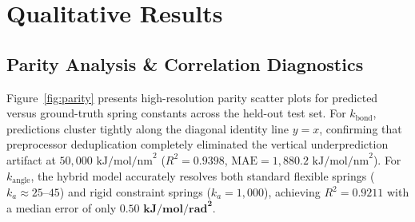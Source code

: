 \documentclass[11pt,a4paper]{article}
\begin{document}
\begin{table}[htbp]
\centering
\caption{Percentage of test predictions within absolute error tolerances ($\text{kJ/mol/rad}^2$).}
\label{tab:tolerance}
\end{table}

\section{Qualitative Results}
\label{sec:qualitative}

\subsection{Parity Analysis \& Correlation Diagnostics}
Figure~\ref{fig:parity} presents high-resolution parity scatter plots for predicted versus ground-truth spring constants across the held-out test set. For $k_{\text{bond}}$, predictions cluster tightly along the diagonal identity line $y = x$, confirming that preprocessor deduplication completely eliminated the vertical underprediction artifact at $50{,}000\text{ kJ/mol/nm}^2$ ($R^2 = \mathbf{0.9398}$, $\text{MAE} = 1{,}880.2\text{ kJ/mol/nm}^2$). For $k_{\text{angle}}$, the hybrid model accurately resolves both standard flexible springs ($k_a \approx 25\text{--}45$) and rigid constraint springs ($k_a = 1{,}000$), achieving $R^2 = \mathbf{0.9211}$ with a median error of only $\mathbf{0.50\text{ kJ/mol/rad}^2}$.
\end{document}
